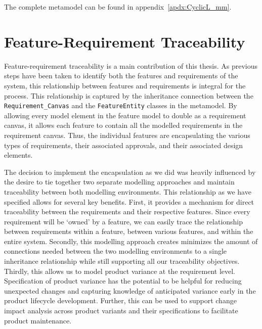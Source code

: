 The complete metamodel can be found in appendix~\ref{apdx:CyclicL_mm}.

\section{Feature-Requirement Traceability}
\label{sec:feat-req_traceability}

Feature-requirement traceability is a main contribution of this thesis. As previous steps have been taken to identify both the features and requirements of the system, this relationship between features and requirements is integral for the process. This relationship is captured by the inheritance connection between the \texttt{Requirement\_Canvas} and the \texttt{FeatureEntity} classes in the metamodel. By allowing every model element in the feature model to double as a requirement canvas, it allows each feature to contain all the modelled requirements in the requirement canvas. Thus, the individual features are encapsulating the various types of requirements, their associated approvals, and their associated design elements. 

The decision to implement the encapsulation as we did was heavily influenced by the desire to tie together two separate modelling approaches and maintain traceability between both modelling environments. This relationship as we have specified allows for several key benefits. First, it provides a mechanism for direct traceability between the requirements and their respective features. Since every requirement will be `owned' by a feature, we can easily trace the relationship between requirements within a feature, between various features, and within the entire system. Secondly, this modelling approach creates minimizes the amount of connections needed between the two modelling environments to a single inheritance relationship while still supporting all our traceability objectives. Thirdly, this allows us to model product variance at the requirement level. Specification of product variance has the potential to be helpful for reducing unexpected changes and capturing knowledge of anticipated variance early in the product lifecycle development. Further, this can be used to support change impact analysis across product variants and their specifications to facilitate product maintenance. 





